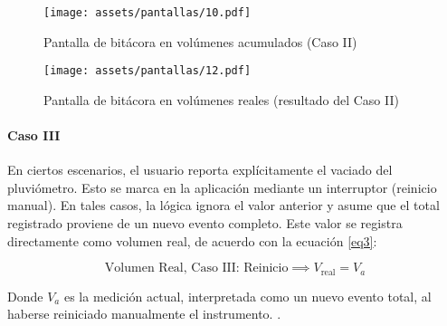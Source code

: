 \begin{figure}[h!]
\centering
\texttt{[image: assets/pantallas/10.pdf]}
\caption{Pantalla de bitácora en volúmenes acumulados (Caso II)}
\label{pantallas10}
\end{figure}

\begin{figure}[h!]
\centering
\texttt{[image: assets/pantallas/12.pdf]}
\caption{Pantalla de bitácora en volúmenes reales (resultado del Caso II)}
\label{pantallas12}
\end{figure}


\paragraph{Caso III}

En ciertos escenarios, el usuario reporta explícitamente el vaciado del pluviómetro. Esto se marca en la aplicación mediante un interruptor (reinicio manual). En tales casos, la lógica ignora el valor anterior y asume que el total registrado proviene de un nuevo evento completo. Este valor se registra directamente como volumen real, de acuerdo con la ecuación \ref{eq3}:

\begin{equation}
\text{Volumen Real, Caso III: Reinicio} \implies V_{\text{real}} = V_{a}
\label{eq3}
\end{equation}

Donde $V_{a}$ es la medición actual, interpretada como un nuevo evento total, al haberse reiniciado manualmente el instrumento. .

















